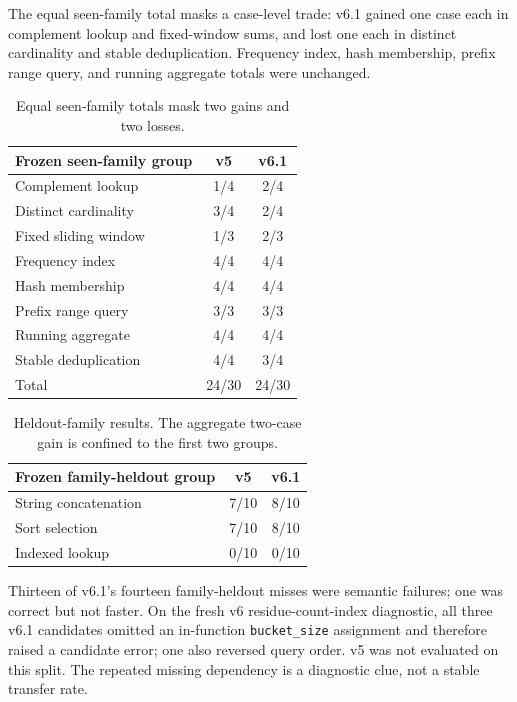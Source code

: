 \documentclass[11pt]{article}
\begin{document}
The equal seen-family total masks a case-level trade: v6.1 gained one case
each in complement lookup and fixed-window sums, and lost one each in
distinct cardinality and stable deduplication. Frequency index, hash
membership, prefix range query, and running aggregate totals were unchanged.

\begin{table}[htbp]
\centering\small
\begin{tabular}{lcc}
\toprule
Frozen seen-family group & v5 & v6.1 \\
\midrule
Complement lookup & 1/4 & 2/4 \\
Distinct cardinality & 3/4 & 2/4 \\
Fixed sliding window & 1/3 & 2/3 \\
Frequency index & 4/4 & 4/4 \\
Hash membership & 4/4 & 4/4 \\
Prefix range query & 3/3 & 3/3 \\
Running aggregate & 4/4 & 4/4 \\
Stable deduplication & 4/4 & 3/4 \\
\midrule
Total & 24/30 & 24/30 \\
\bottomrule
\end{tabular}
\caption{Equal seen-family totals mask two gains and two losses.}
\label{tab:seenfamilies}
\end{table}

\begin{table}[h]
\centering\small
\begin{tabular}{lcc}
\toprule
Frozen family-heldout group & v5 & v6.1 \\
\midrule
String concatenation & 7/10 & 8/10 \\
Sort selection & 7/10 & 8/10 \\
Indexed lookup & 0/10 & 0/10 \\
\bottomrule
\end{tabular}
\caption{Heldout-family results. The aggregate two-case gain is confined
to the first two groups.}
\end{table}



Thirteen of v6.1's fourteen family-heldout misses were semantic failures;
one was correct but not faster. On the fresh v6 residue-count-index
diagnostic, all three v6.1 candidates omitted an in-function
\texttt{bucket\_size} assignment and therefore raised a candidate error;
one also reversed query order. v5 was not evaluated on this split. The
repeated missing dependency is a diagnostic clue, not a stable transfer rate.
\end{document}
